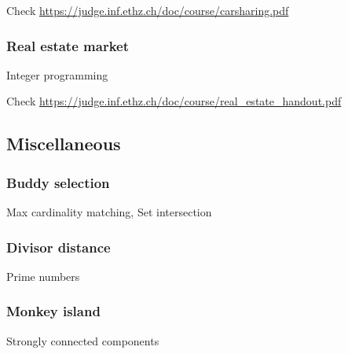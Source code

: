 \documentclass[10pt,a4paper,landscape,twocolumn,twoside]{article}
\begin{document}
		Check \url{https://judge.inf.ethz.ch/doc/course/carsharing.pdf}
		

		\subsubsection{Real estate market}
		\label{subs:Real estate market}
		\begin{keywords}Integer programming\end{keywords}

		Check \url{https://judge.inf.ethz.ch/doc/course/real_estate_handout.pdf}
		

	\newpage
	\subsection{Miscellaneous}

		\subsubsection{Buddy selection}
		\begin{keywords}Max cardinality matching, Set intersection\end{keywords}
		

		\subsubsection{Divisor distance}
		\begin{keywords}Prime numbers\end{keywords}
		

		\subsubsection{Monkey island}
		\begin{keywords}Strongly connected components\end{keywords}
		
\end{document}
